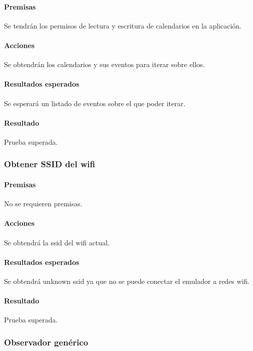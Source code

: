 \paragraph{Premisas}
Se tendrán los permisos de lectura y escritura de calendarios en la aplicación.


\paragraph{Acciones}
Se obtendrán los calendarios y sus eventos para iterar sobre ellos.

\paragraph{Resultados esperados}
Se esperará un listado de eventos sobre el que poder iterar.

\paragraph{Resultado}
Prueba superada.


\subsubsection{Obtener SSID del wifi}

\paragraph{Premisas}
No se requieren premisas.

\paragraph{Acciones}
Se obtendrá la ssid del wifi actual.

\paragraph{Resultados esperados}
Se obtendrá unknown ssid ya que no se puede conectar el emulador a redes wifi.

\paragraph{Resultado}
Prueba superada.

\subsubsection{Observador genérico}

